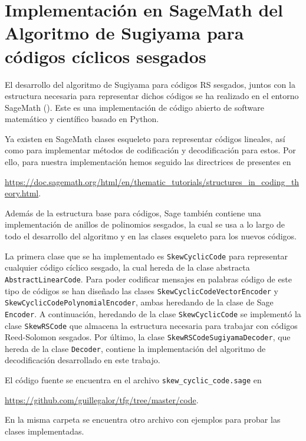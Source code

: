 \chapter{Implementación en SageMath del Algoritmo de Sugiyama para códigos cíclicos sesgados}%
\label{chap:implementación_en_sagemath_del_algoritmo_de_sugiyama_para_códigos_cíclicos_sesgados}

El desarrollo del algoritmo de Sugiyama para códigos RS sesgados, juntos con la estructura necesaria para representar dichos códigos se ha realizado en el entorno SageMath (\cite{sagemath}). Este es una implementación de código abierto de software matemático y científico basado en Python.

Ya existen en SageMath clases esqueleto para representar códigos lineales, así como para implementar métodos de codificación y decodificación para estos. Por ello, para nuestra implementación hemos seguido las directrices de presentes en
\begin{center}
\url{https://doc.sagemath.org/html/en/thematic_tutorials/structures_in_coding_theory.html}.
\end{center}
Además de la estructura base para códigos, Sage también contiene una implementación de anillos de polinomios sesgados, la cual se usa a lo largo de todo el desarrollo del algoritmo y en las clases esqueleto para los nuevos códigos.

La primera clase que se ha implementado es \texttt{SkewCyclicCode} para representar cualquier código cíclico sesgado, la cual hereda de la clase abstracta \texttt{AbstractLinearCode}. Para poder codificar mensajes en palabras código de este tipo de códigos se han diseñado las clases \texttt{SkewCyclicCodeVectorEncoder} y \texttt{SkewCyclicCodePolynomialEncoder}, ambas heredando de la clase de Sage \texttt{Encoder}. A continuación, heredando de la clase \texttt{SkewCyclicCode} se implementó la clase \texttt{SkewRSCode} que almacena la estructura necesaria para trabajar con códigos Reed-Solomon sesgados. Por último, la clase \texttt{SkewRSCodeSugiyamaDecoder}, que hereda de la clase \texttt{Decoder}, contiene la implementación del algoritmo de decodificación desarrollado en este trabajo.

El código fuente se encuentra en el archivo \texttt{skew\_cyclic\_code.sage} en
\begin{center}
\url{https://github.com/guillegalor/tfg/tree/master/code}.
\end{center}
En la misma carpeta se encuentra otro archivo con ejemplos para probar las clases implementadas.

